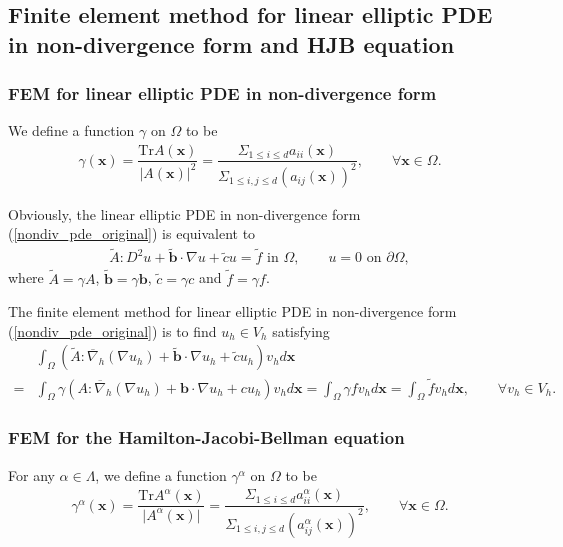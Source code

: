 \documentclass[12pt]{amsart}
\newcommand{\boldx}{\boldsymbol{x}}
\theoremstyle{definition}
\theoremstyle{remark}
\begin{document}
\subsection{Finite element method for linear elliptic PDE in non-divergence form and HJB equation}  
\label{sec_fem}

\subsubsection{FEM for linear elliptic PDE in non-divergence form} 

We define a function $\gamma$ on $\Omega$ to be 
\begin{align}
\label{def_gamma}
\gamma(\boldx) = \dfrac{\text{Tr}A(\boldx)}{\vert A(\boldx)\vert^{2}}
 = \dfrac{\Sigma_{1\leq i \leq d}a_{ii}(\boldx)}{\Sigma_{1\leq i,j\leq d}(a_{ij}(\boldx))^{2}}, 
\qquad \forall \boldx \in \Omega.
\end{align}

Obviously, the linear elliptic PDE in non-divergence form (\ref{nondiv_pde_original}) is equivalent to 
\begin{align}
\label{nondiv_pde}
\tilde{A}:D^{2}u + \tilde{\boldsymbol{b}}\cdot \nabla u 
+ \tilde{c}u = \tilde{f}  \text{ in } \Omega, \qquad
u = 0 \text{ on } \partial\Omega,
\end{align}
where $\tilde{A} = \gamma A$, $\tilde{\boldsymbol{b}} = \gamma
\boldsymbol{b}$, $\tilde{c} = \gamma c$ and $\tilde{f} = \gamma f$.

The finite element method for linear elliptic PDE in non-divergence form (\ref{nondiv_pde_original}) is to find 
$u_{h} \in V_{h}$ satisfying 
\begin{align}
\label{nondiv_fem}
& \int_{\Omega}(\tilde{A}: \overline{\nabla}_{h}(\nabla u_{h}) + \tilde{\boldsymbol{b}}\cdot \nabla u_{h} 
+ \tilde{c}u_{h} ) v_{h} d\boldx \\
\nonumber 
= & \int_{\Omega} \gamma (A: \overline{\nabla}_{h}(\nabla u_{h}) + \boldsymbol{b}\cdot \nabla u_{h} 
+ cu_{h} ) v_{h} d\boldx 
= \int_{\Omega} \gamma fv_{h} d\boldx = \int_{\Omega} \tilde{f}v_{h} d\boldx, \qquad \forall v_{h} \in V_{h}.
\end{align}

\subsubsection{FEM for the Hamilton-Jacobi-Bellman equation}

For any $\alpha \in \Lambda$, we define a function $\gamma^{\alpha}$ 
on $\Omega$ to be
\begin{align}
\label{def_gamma_alpha}
\gamma^{\alpha}(\boldx) = \dfrac{\text{Tr}A^{\alpha}(\boldx)}{\vert A^{\alpha}(\boldx)\vert}
=\dfrac{\Sigma_{1 \leq i \leq d}  a_{ii}^{\alpha}(\boldx) }
{\Sigma_{1\leq i,j \leq d} (a_{ij}^{\alpha}(\boldx))^{2}},\qquad \forall \boldx \in \Omega.
\end{align} 
\end{document}
